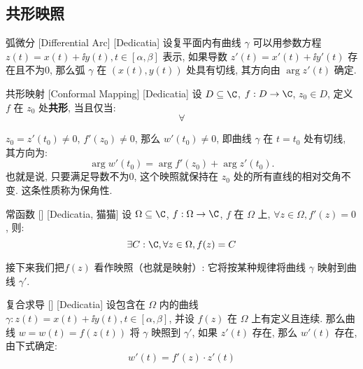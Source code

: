 \documentclass[UTF8]{ctexart}
\begin{document}

    \subsection{共形映照}

        \begin{dfn}
            [UUID]
            {弧微分}
            [Differential Arc]
            [Dedicatia]
            设复平面内有曲线 \(\gamma\) 可以用参数方程 \(z(t)=x(t)+\ii y(t), t\in[\alpha,\beta]\) 表示, 如果导数 \(z'(t)=x'(t)+\ii y'(t)\) 存在且不为0, 那么弧 \(\gamma\) 在 \((x(t),y(t))\) 处具有切线, 其方向由 \(\arg z'(t)\) 确定. 
        \end{dfn}

        \begin{dfn}
            {共形映射}
            [Conformal Mapping]
            [Dedicatia]
            设 \(D\subseteq\C\), \(f:D\to\C\), \(z_0\in D\), 定义 \(f\) 在 \(z_0\) 处\textbf{共形}, 当且仅当: 
            \[\forall \]
            
            \(z_0=z'(t_0)\neq 0\),  \(f'(z_0)\neq 0\), 那么 \(w'(t_0)\neq 0\), 即曲线 \(\gamma\) 在 \(t=t_0\) 处有切线, 其方向为: 
            \[\arg w'(t_0)=\arg f'(z_0)+\arg z'(t_0).\]
            也就是说, 只要满足导数不为0, 这个映照就保持在 \(z_0\) 处的所有直线的相对交角不变. 这条性质称为保角性. 
        \end{dfn}

        \begin{ppt}
            [TrivialAnalyticalFunction]
            {常函数}
            []
            [Dedicatia, 猫猫]
            设 \(\Omega\subseteq\C\), \(f:\Omega\to\C\), \(f\) 在 \(\Omega\) 上, \(\forall z\in\Omega, f'(z)=0\), 则: 
            \[\exists C:\C, \forall z\in\Omega, f(z)=C\]
        \end{ppt}

        接下来我们把  \(f(z)\) 看作映照（也就是映射）: 它将按某种规律将曲线 \(\gamma\) 映射到曲线 \(\gamma'\). 

        \begin{thm}
            [UUID]
            {复合求导}
            []
            [Dedicatia]
            设包含在 \(\Omega\) 内的曲线 \(\gamma:z(t)=x(t)+\ii y(t), t\in[\alpha,\beta]\), 并设 \(f(z)\) 在 \(\Omega\) 上有定义且连续. 那么曲线 \(w=w(t)=f(z(t))\) 将 \(\gamma\) 映照到 \(\gamma'\), 如果 \(z'(t)\) 存在, 那么 \(w'(t)\) 存在, 由下式确定: 
            \[w'(t)=f'(z)\cdot z'(t)\]
        \end{thm}
\end{document}
